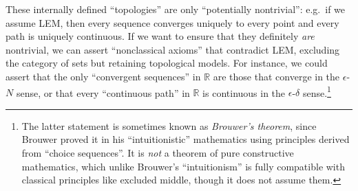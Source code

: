 \documentclass[10pt]{article}
\def\R{\mathbb{R}}
\def\U{\mathscr{U}}
\def\T{\mathcal{T}}
\numberwithin{equation}{section}
\begin{document}
These internally defined ``topologies'' are only ``potentially nontrivial'': e.g.\ if we assume LEM, then every sequence converges uniquely to every point and every path is uniquely continuous.
If we want to ensure that they definitely \emph{are} nontrivial, we can assert ``nonclassical axioms'' that contradict LEM, excluding the category of sets but retaining topological models.
For instance, we could assert that the only ``convergent sequences'' in $\R$ are those that converge in the $\epsilon$-$N$ sense, or that every ``continuous path'' in $\R$ is continuous in the $\epsilon$-$\delta$ sense.\footnote{The latter statement is sometimes known as \emph{Brouwer's theorem}, since Brouwer proved it in his ``intuitionistic'' mathematics using principles derived from ``choice sequences''.  It is \emph{not} a theorem of pure constructive mathematics, which unlike Brouwer's ``intuitionism'' is fully compatible with classical principles like excluded middle, though it does not assume them.}
\end{document}
